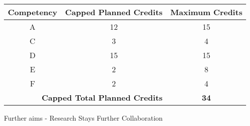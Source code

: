 \begin{tabular}{|c|c|c|}
    \hline
    \textbf{Competency} & \textbf{Capped Planned Credits} & \textbf{Maximum Credits} \\ \hline
    A                   & 12                              & 15                       \\ \hline
    C                   & 3                               & 4                        \\ \hline
    D                   & 15                              & 15                       \\ \hline
    E                   & 2                               & 8                        \\ \hline
    F                   & 2                               & 4                        \\ \hline
    \multicolumn{2}{|r|}{\textbf{Capped Total Planned Credits}} & \textbf{34}      \\ \hline
\end{tabular}



Further aims -
Research Stays
Further Collaboration

